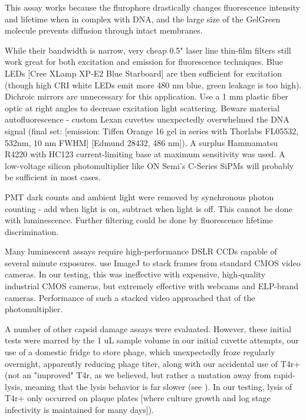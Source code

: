 \documentclass[paper.tex]{subfiles}
\begin{document}
\begin{multicols}{1}
This assay works because the flurophore drastically changes fluorescence intensity and lifetime when in complex with DNA\cite{SYBR2012}\cite{Characterization2010}, and the large size of the GelGreen molecule prevents diffusion through intact membranes.

While their bandwidth is narrow, very cheap 0.5" laser line thin-film filters still work great for both excitation and emission for fluorescence techniques. Blue LEDs [Cree XLamp XP-E2 Blue Starboard] are then sufficient for excitation (though high CRI white LEDs emit more 480 nm blue, green leakage is too high). Dichroic mirrors are unnecessary for this application. Use a 1 mm plastic fiber optic at right angles to decrease excitation light scattering. Beware material autofluorescence - custom Lexan cuvettes unexpectedly overwhelmed the DNA signal (final set: [emission: Tiffen Orange 16 gel\cite{lide2004crc} in series with Thorlabs FL05532, 532nm, 10 nm FWHM] [Edmund 28432, 486 nm]). A surplus Hammamatsu R4220 with HC123 current-limiting base at maximum sensitivity was used. A low-voltage silicon photomultiplier like ON Semi's C-Series SiPMs will probably be sufficient in most cases.

PMT dark counts and ambient light were removed by synchronous photon counting - add when light is on, subtract when light is off.  This cannot be done with luminescence. Further filtering could be done by fluorescence lifetime discrimination. 

Many luminescent assays require high-performance DSLR CCDs capable of several minute exposures. \cite{Image2012} use ImageJ\cite{NIH2012} to stack frames from standard CMOS video cameras. In our testing, this was ineffective with expensive, high-quality industrial CMOS cameras, but extremely effective with webcams and ELP-brand cameras. Performance of such a stacked video approached that of the photomultiplier. 

A number of other capsid damage assays were evaluated. However, these initial tests were marred by the 1 uL sample volume in our initial cuvette attempts, our use of a domestic fridge to store phage, which unexpectedly froze regularly overnight, apparently reducing phage titer, along with our accidental use of T4r+ (not an "improved" T4r, as we believed, but rather a mutation away from rapid-lysis, meaning that the lysis behavior is far slower (see \cite{Spontaneous1946}). In our testing, lysis of T4r+ only occurred on plaque plates [where culture growth and log stage infectivity is maintained for many days]). 


\end{multicols}
\end{document}
